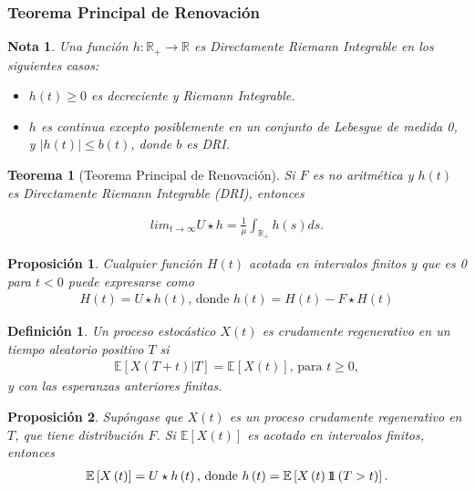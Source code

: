 \documentclass{article}
\newtheorem{Def}{Definición}
\newtheorem{Teo}{Teorema}
\newtheorem{Note}{Nota}
\newtheorem{Prop}{Proposición}
\newcommand{\rea}{\mathbb{R}}
\newcommand{\esp}{\mathbb{E}}
\newcommand{\indora}{\mbox{$1$\hspace{-0.8ex}$1$}}
\begin{document}
%
\subsubsection{Teorema Principal de Renovaci\'on}
%

\begin{Note} Una funci\'on $h:\rea_{+}\rightarrow\rea$ es Directamente Riemann Integrable en los siguientes casos:
\begin{itemize}
\item[a)] $h\left(t\right)\geq0$ es decreciente y Riemann Integrable.
\item[b)] $h$ es continua excepto posiblemente en un conjunto de Lebesgue de medida 0, y $|h\left(t\right)|\leq b\left(t\right)$, donde $b$ es DRI.
\end{itemize}
\end{Note}

\begin{Teo}[Teorema Principal de Renovaci\'on]
Si $F$ es no aritm\'etica y $h\left(t\right)$ es Directamente Riemann Integrable (DRI), entonces

\begin{eqnarray*}
lim_{t\rightarrow\infty}U\star h=\frac{1}{\mu}\int_{\rea_{+}}h\left(s\right)ds.
\end{eqnarray*}
\end{Teo}

\begin{Prop}
Cualquier funci\'on $H\left(t\right)$ acotada en intervalos finitos y que es 0 para $t<0$ puede expresarse como
\begin{eqnarray*}
H\left(t\right)=U\star h\left(t\right)\textrm{,  donde }h\left(t\right)=H\left(t\right)-F\star H\left(t\right)
\end{eqnarray*}
\end{Prop}

\begin{Def}
Un proceso estoc\'astico $X\left(t\right)$ es crudamente regenerativo en un tiempo aleatorio positivo $T$ si
\begin{eqnarray*}
\esp\left[X\left(T+t\right)|T\right]=\esp\left[X\left(t\right)\right]\textrm{, para }t\geq0,\end{eqnarray*}
y con las esperanzas anteriores finitas.
\end{Def}

\begin{Prop}
Sup\'ongase que $X\left(t\right)$ es un proceso crudamente regenerativo en $T$, que tiene distribuci\'on $F$. Si $\esp\left[X\left(t\right)\right]$ es acotado en intervalos finitos, entonces
\begin{eqnarray*}
\esp\left[X\left(t\right)\right]=U\star h\left(t\right)\textrm{,  donde }h\left(t\right)=\esp\left[X\left(t\right)\indora\left(T>t\right)\right].
\end{eqnarray*}
\end{Prop}
\end{document}
